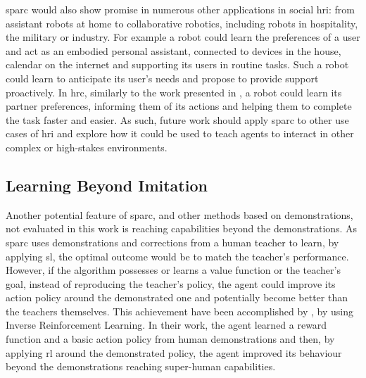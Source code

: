 \gls{sparc} would also show promise in numerous other applications in social \gls{hri}: from assistant robots at home to collaborative robotics, including robots in hospitality, the military or industry. For example a robot could learn the preferences of a user and act as an embodied personal assistant, connected to devices in the house, calendar on the internet and supporting its users in routine tasks. Such a robot could learn to anticipate its user's needs and propose to provide support proactively. In \gls{hrc}, similarly to the work presented in \cite{munzer2017efficient}, a robot could learn its partner preferences, informing them of its actions and helping them to complete the task faster and easier. As such, future work should apply \gls{sparc} to other use cases of \gls{hri} and explore how it could be used to teach agents to interact in other complex or high-stakes environments.


\subsection{Learning Beyond Imitation}\label{sec:disc_beyond}

Another potential feature of \gls{sparc}, and other methods based on demonstrations, not evaluated in this work is reaching capabilities beyond the demonstrations. As \gls{sparc} uses demonstrations and corrections from a human teacher to learn, by applying \gls{sl}, the optimal outcome would be to match the teacher's performance. However, if the algorithm possesses or learns a value function or the teacher's goal, instead of reproducing the teacher's policy, the agent could improve its action policy around the demonstrated one and potentially become better than the teachers themselves. This achievement have been accomplished by \cite{abbeel2004apprenticeship}, by using Inverse Reinforcement Learning. In their work, the agent learned a reward function and a basic action policy from human demonstrations and then, by applying \gls{rl} around the demonstrated policy, the agent improved its behaviour beyond the demonstrations reaching super-human capabilities. 

